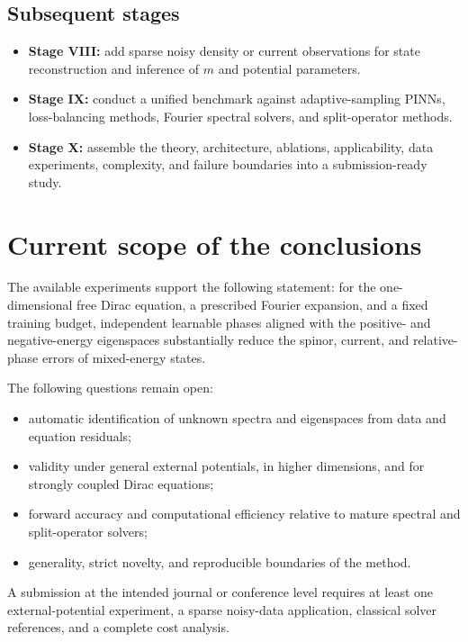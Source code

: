 \documentclass[a4paper,11pt]{article}
\begin{document}
\subsection{Subsequent stages}

\begin{itemize}
  \item \textbf{Stage VIII:} add sparse noisy density or current observations
  for state reconstruction and inference of \(m\) and potential parameters.
  \item \textbf{Stage IX:} conduct a unified benchmark against adaptive-sampling
  PINNs, loss-balancing methods, Fourier spectral solvers, and split-operator
  methods.
  \item \textbf{Stage X:} assemble the theory, architecture, ablations,
  applicability, data experiments, complexity, and failure boundaries into a
  submission-ready study.
\end{itemize}

\section{Current scope of the conclusions}

The available experiments support the following statement: for the
one-dimensional free Dirac equation, a prescribed Fourier expansion, and a
fixed training budget, independent learnable phases aligned with the positive-
and negative-energy eigenspaces substantially reduce the spinor, current, and
relative-phase errors of mixed-energy states.

The following questions remain open:
\begin{itemize}
  \item automatic identification of unknown spectra and eigenspaces from data
  and equation residuals;
  \item validity under general external potentials, in higher dimensions, and
  for strongly coupled Dirac equations;
  \item forward accuracy and computational efficiency relative to mature
  spectral and split-operator solvers;
  \item generality, strict novelty, and reproducible boundaries of the method.
\end{itemize}

A submission at the intended journal or conference level requires at least one
external-potential experiment, a sparse noisy-data application, classical
solver references, and a complete cost analysis.
\end{document}
